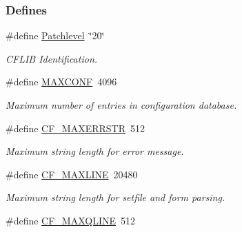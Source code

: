 \subsubsection*{Defines}
\begin{CompactItemize}
\item 
\hypertarget{group__cflib__core_g0beb5d41f2b506f1c969c56731bb9490}{
\#define \hyperlink{group__cflib__core_g0beb5d41f2b506f1c969c56731bb9490}{Patchlevel}~\char`\"{}20\char`\"{}}
\label{group__cflib__core_g0beb5d41f2b506f1c969c56731bb9490}

\begin{CompactList}\small\item\em CFLIB Identification. \item\end{CompactList}\item 
\hypertarget{group__cflib__core_g1662beae23df229341c28d286379e2ad}{
\#define \hyperlink{group__cflib__core_g1662beae23df229341c28d286379e2ad}{MAXCONF}~4096}
\label{group__cflib__core_g1662beae23df229341c28d286379e2ad}

\begin{CompactList}\small\item\em Maximum number of entries in configuration database. \item\end{CompactList}\item 
\hypertarget{group__cflib__core_gf78e4b950c9aa49b752e4460342ea3bf}{
\#define \hyperlink{group__cflib__core_gf78e4b950c9aa49b752e4460342ea3bf}{CF\_\-MAXERRSTR}~512}
\label{group__cflib__core_gf78e4b950c9aa49b752e4460342ea3bf}

\begin{CompactList}\small\item\em Maximum string length for error message. \item\end{CompactList}\item 
\hypertarget{group__cflib__core_gc7ffaf92294adc15284233965f54c03e}{
\#define \hyperlink{group__cflib__core_gc7ffaf92294adc15284233965f54c03e}{CF\_\-MAXLINE}~20480}
\label{group__cflib__core_gc7ffaf92294adc15284233965f54c03e}

\begin{CompactList}\small\item\em Maximum string length for setfile and form parsing. \item\end{CompactList}\item 
\hypertarget{group__cflib__core_gc91ed2022fe6617330f369b4e20b875b}{
\#define \hyperlink{group__cflib__core_gc91ed2022fe6617330f369b4e20b875b}{CF\_\-MAXQLINE}~512}
\label{group__cflib__core_gc91ed2022fe6617330f369b4e20b875b}


\end{CompactItemize}
